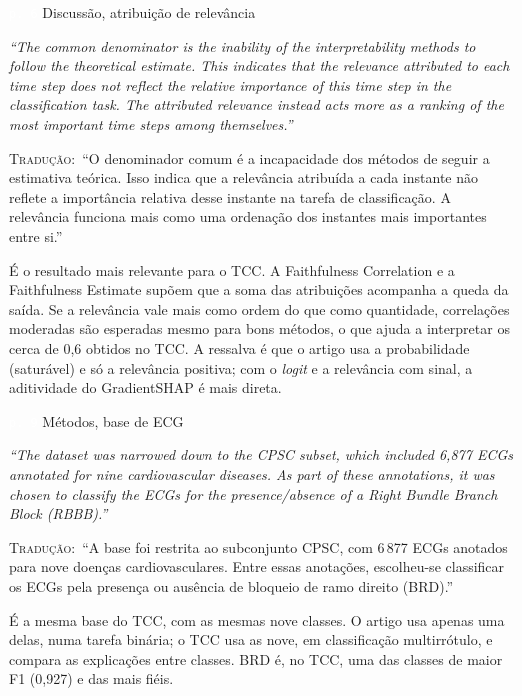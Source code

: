 \documentclass[11pt,a4paper]{article}
\newcommand{\pagechip}[1]{{\setlength{\fboxsep}{1.5pt}\colorbox{cAcc}{\textcolor{white}{\scriptsize\texttt{#1}}}}}
\newenvironment{origquote}{\par\itshape\small}{\par}
\newenvironment{tradquote}{\par\small\textsc{Tradução:}\ }{\par}
\newcommand{\explab}[1]{\par\smallskip{\small\color{cAcc}\textbf{\MakeUppercase{#1}}}\par}
\begin{document}
\begin{citacard}{\pagechip{p. 6} Discussão, atribuição de relevância}
\begin{origquote}“The common denominator is the inability of the interpretability methods to follow the theoretical estimate. This indicates that the relevance attributed to each time step does not reflect the relative importance of this time step in the classification task. The attributed relevance instead acts more as a ranking of the most important time steps among themselves.”\end{origquote}
\begin{tradquote}“O denominador comum é a incapacidade dos métodos de seguir a estimativa teórica. Isso indica que a relevância atribuída a cada instante não reflete a importância relativa desse instante na tarefa de classificação. A relevância funciona mais como uma ordenação dos instantes mais importantes entre si.”\end{tradquote}
\explab{Explicação}
É o resultado mais relevante para o TCC. A Faithfulness Correlation e a Faithfulness Estimate supõem que a soma das atribuições acompanha a queda da saída. Se a relevância vale mais como ordem do que como quantidade, correlações moderadas são esperadas mesmo para bons métodos, o que ajuda a interpretar os cerca de 0,6 obtidos no TCC. A ressalva é que o artigo usa a probabilidade (saturável) e só a relevância positiva; com o \textit{logit} e a relevância com sinal, a aditividade do GradientSHAP é mais direta.
\end{citacard}

\begin{citacard}{\pagechip{p. 9} Métodos, base de ECG}
\begin{origquote}“The dataset was narrowed down to the CPSC subset, which included 6,877 ECGs annotated for nine cardiovascular diseases. As part of these annotations, it was chosen to classify the ECGs for the presence/absence of a Right Bundle Branch Block (RBBB).”\end{origquote}
\begin{tradquote}“A base foi restrita ao subconjunto CPSC, com 6\,877 ECGs anotados para nove doenças cardiovasculares. Entre essas anotações, escolheu-se classificar os ECGs pela presença ou ausência de bloqueio de ramo direito (BRD).”\end{tradquote}
\explab{Explicação}
É a mesma base do TCC, com as mesmas nove classes. O artigo usa apenas uma delas, numa tarefa binária; o TCC usa as nove, em classificação multirrótulo, e compara as explicações entre classes. BRD é, no TCC, uma das classes de maior F1 (0,927) e das mais fiéis.
\end{citacard}
\end{document}
